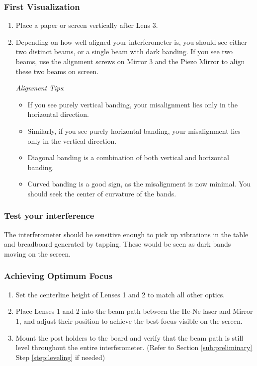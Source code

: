     \subsubsection{First Visualization}
        \begin{enumerate}
        \item Place a paper or screen vertically after Lens 3.
        \item Depending on how well aligned your interferometer is, you should
        see either two distinct beams, or a single beam with dark banding. If
        you see two beams, use the alignment screws on Mirror 3 and the Piezo
        Mirror to align these two beams on screen.

            \emph{Alignment Tips}:
            \begin{itemize}
            \item If you see purely vertical banding, your misalignment lies
            only in the horizontal direction.
            \item Similarly, if you see purely horizontal banding, your
            misalignment lies only in the vertical direction.
            \item Diagonal banding is a combination of both vertical and
            horizontal banding.
            \item Curved banding is a good sign, as the misalignment is now
            minimal.  You should seek the center of curvature of the bands.
            \end{itemize}
        \end{enumerate} 
    \subsubsection{Test your interference}

        The interferometer should be sensitive enough to pick up vibrations in
        the table and breadboard generated by tapping. These would be seen as
        dark bands moving on the screen.
    \subsubsection{Achieving Optimum Focus}
        \begin{enumerate}
        \item Set the centerline height of Lenses 1 and 2 to match all other
        optics.
        \item Place Lenses 1 and 2 into the beam path between the He-Ne laser
        and Mirror 1, and adjust their position to achieve the best focus
        visible on the screen.
        \item Mount the post holders to the board and verify that the beam path
        is still level throughout the entire interferometer. (Refer to Section
        \ref{sub:preliminary} Step \ref{step:leveling} if needed)
        \end{enumerate}


